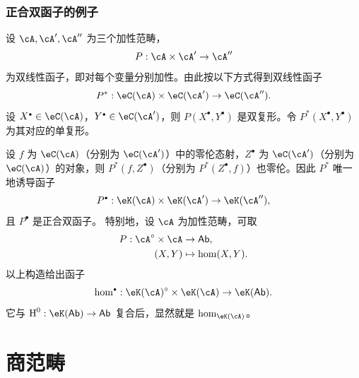 \subsubsection{正合双函子的例子}\label{VIII:1-3-3}
设 $\cA,\cA',\cA''$ 为三个加性范畴，
\[P:\cA\times\cA'\to\cA''\]
为双线性函子，即对每个变量分别加性。由此按以下方式得到双线性函子
\[P^\ast:\eC(\cA)\times\eC(\cA')\to\eC(\cA'').\]
设 $X^\bullet\in\eC(\cA)$，$Y^\bullet\in\eC(\cA')$，则 $P(X^\bullet,Y^\bullet)$ 是双复形。令 $P^\ast(X^\bullet,Y^\bullet)$ 为其对应的单复形。

设 $f$ 为 $\eC(\cA)$（分别为 $\eC(\cA')$）中的零伦态射，$Z^\bullet$ 为 $\eC(\cA')$（分别为 $\eC(\cA)$）的对象，则 $P^\ast(f,Z^\bullet)$（分别为 $P^\ast(Z^\bullet,f)$）也零伦。因此 $P^\ast$ 唯一地诱导函子
\[P^\bullet:\eK(\cA)\times\eK(\cA')\to\eK(\cA''),\]
且 $P^\bullet$ 是正合双函子。
特别地，设 $\cA$ 为加性范畴，可取
\begin{align*}
 P:\cA^\circ\times\cA&\to\mathsf{Ab},\\
 (X,Y)&\mapsto\hom(X,Y).
\end{align*}
以上构造给出函子
\[\hom^\bullet:\eK(\cA)^\circ\times\eK(\cA)\to\eK(\mathsf{Ab}).\]
它与 $\h^0:\eK(\mathsf{Ab})\to\mathsf{Ab}$ 复合后，显然就是 $\hom_{\eK(\cA)}$。
\section{商范畴}\label{VIII:2}
